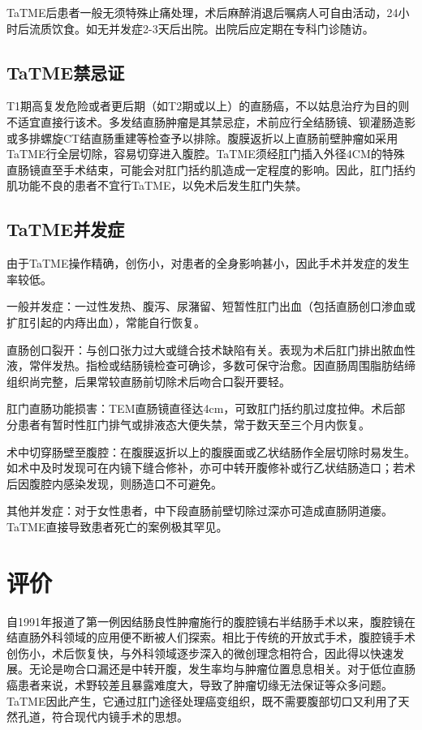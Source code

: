 \documentclass[a4paper,11pt,onecolumn,twoside]{article}
\begin{document}
\begin{multicols}{2}
    TaTME后患者一般无须特殊止痛处理，术后麻醉消退后嘱病人可自由活动，24小时后流质饮食。如无并发症2-3天后出院。出院后应定期在专科门诊随访。

    \subsection{TaTME禁忌证}
    T1期高复发危险或者更后期（如T2期或以上）的直肠癌，不以姑息治疗为目的则不适宜直接行该术。多发结直肠肿瘤是其禁忌症，术前应行全结肠镜、钡灌肠造影或多排螺旋CT结直肠重建等检查予以排除。腹膜返折以上直肠前壁肿瘤如采用TaTME行全层切除，容易切穿进入腹腔。TaTME须经肛门插入外径4CM的特殊直肠镜直至手术结束，可能会对肛门括约肌造成一定程度的影响。因此，肛门括约肌功能不良的患者不宜行TaTME，以免术后发生肛门失禁\supercite{13}。

    \subsection{TaTME并发症}
    由于TaTME操作精确，创伤小，对患者的全身影响甚小，因此手术并发症的发生率较低。

    \begin{compactenum}
        \item 一般并发症：一过性发热、腹泻、尿潴留、短暂性肛门出血（包括直肠创口渗血或扩肛引起的内痔出血），常能自行恢复。
        \item 直肠创口裂开：与创口张力过大或缝合技术缺陷有关。表现为术后肛门排出脓血性液，常伴发热。指检或结肠镜检查可确诊，多数可保守治愈。因直肠周围脂肪结缔组织尚完整，后果常较直肠前切除术后吻合口裂开要轻。
        \item 肛门直肠功能损害：TEM直肠镜直径达4cm，可致肛门括约肌过度拉伸。术后部分患者有暂时性肛门排气或排液态大便失禁，常于数天至三个月内恢复。
        \item 术中切穿肠壁至腹腔：在腹膜返折以上的腹膜面或乙状结肠作全层切除时易发生。如术中及时发现可在内镜下缝合修补，亦可中转开腹修补或行乙状结肠造口；若术后因腹腔内感染发现，则肠造口不可避免\supercite{14}。
        \item 其他并发症：对于女性患者，中下段直肠前壁切除过深亦可造成直肠阴道瘘。TaTME直接导致患者死亡的案例极其罕见\supercite{15}。
    \end{compactenum}

    \section{评价}
    自1991年报道了第一例因结肠良性肿瘤施行的腹腔镜右半结肠手术以来，腹腔镜在结直肠外科领域的应用便不断被人们探索。相比于传统的开放式手术，腹腔镜手术创伤小，术后恢复快，与外科领域逐步深入的微创理念相符合，因此得以快速发展。\supercite{W1}无论是吻合口漏还是中转开腹，发生率均与肿瘤位置息息相关。对于低位直肠癌患者来说，术野较差且暴露难度大，导致了肿瘤切缘无法保证等众多问题。TaTME因此产生，它通过肛门途径处理癌变组织，既不需要腹部切口又利用了天然孔道，符合现代内镜手术的思想。


\end{multicols}
\end{document}
